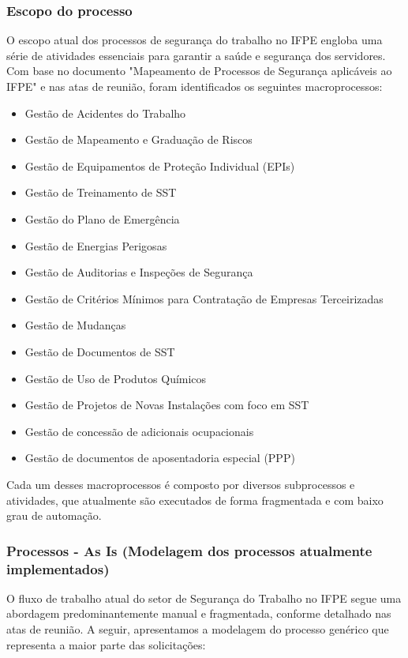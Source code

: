 \documentclass[12pt,a4paper]{article}
\begin{document}
\subsubsection{Escopo do processo}
O escopo atual dos processos de segurança do trabalho no IFPE engloba uma série de atividades essenciais para garantir a saúde e segurança dos servidores. Com base no documento "Mapeamento de Processos de Segurança aplicáveis ao IFPE" e nas atas de reunião, foram identificados os seguintes macroprocessos:

\begin{itemize}
    \item Gestão de Acidentes do Trabalho
    \item Gestão de Mapeamento e Graduação de Riscos
    \item Gestão de Equipamentos de Proteção Individual (EPIs)
    \item Gestão de Treinamento de SST
    \item Gestão do Plano de Emergência
    \item Gestão de Energias Perigosas
    \item Gestão de Auditorias e Inspeções de Segurança
    \item Gestão de Critérios Mínimos para Contratação de Empresas Terceirizadas
    \item Gestão de Mudanças
    \item Gestão de Documentos de SST
    \item Gestão de Uso de Produtos Químicos
    \item Gestão de Projetos de Novas Instalações com foco em SST
    \item Gestão de concessão de adicionais ocupacionais
    \item Gestão de documentos de aposentadoria especial (PPP)
\end{itemize}

Cada um desses macroprocessos é composto por diversos subprocessos e atividades, que atualmente são executados de forma fragmentada e com baixo grau de automação.

\subsubsection{Processos - As Is (Modelagem dos processos atualmente implementados)}

O fluxo de trabalho atual do setor de Segurança do Trabalho no IFPE segue uma abordagem predominantemente manual e fragmentada, conforme detalhado nas atas de reunião. A seguir, apresentamos a modelagem do processo genérico que representa a maior parte das solicitações:
\end{document}

